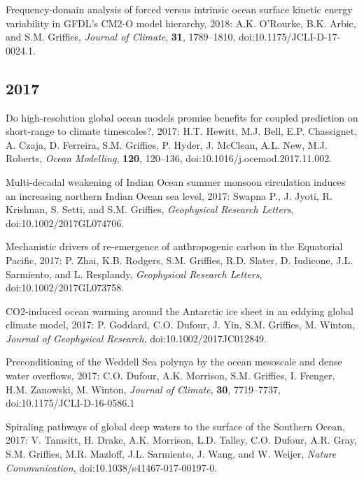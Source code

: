 \begin{etaremune}
\item Frequency-domain analysis of forced versus intrinsic ocean surface kinetic energy variability in GFDL's CM2-O model hierarchy, 2018: A.K. O'Rourke, B.K. Arbic, and S.M. Grif\/f\/ies, {\it Journal of Climate}, {\bf 31}, 1789--1810, doi:10.1175/JCLI-D-17-0024.1.


\subsection*{\sc \color{Maroon} 2017}


\item Do high-resolution global ocean models promise benefits for coupled prediction on short-range to climate timescales?, 2017: H.T. Hewitt, M.J. Bell, E.P. Chassignet, A. Czaja, D. Ferreira, S.M. Grif\/f\/ies, P. Hyder, J. McClean, A.L. New, M.J. Roberts, {\it Ocean Modelling}, {\bf 120}, 120--136, doi:10.1016/j.ocemod.2017.11.002.

\item Multi-decadal weakening of Indian Ocean summer monsoon circulation induces an increasing northern Indian Ocean sea level, 2017: Swapna P., J. Jyoti, R. Krishnan, S. Setti, and S.M. Grif\/f\/ies, {\it Geophysical Research  Letters}, \newline doi:10.1002/2017GL074706.



\item Mechanistic drivers of re-emergence of anthropogenic carbon in the Equatorial Pacific, 2017: P. Zhai, K.B. Rodgers, S.M. Grif\/fies, R.D. Slater, D. Iudicone, J.L. Sarmiento, and L. Resplandy, {\it Geophysical Research Letters}, doi:10.1002/2017GL073758.

\item CO2-induced ocean warming around the Antarctic ice sheet in an eddying global climate model, 2017: P. Goddard, C.O. Dufour, J. Yin, S.M. Grif\/f\/ies, M. Winton, {\it Journal of Geophysical Research}, doi:10.1002/2017JC012849. 

\item Preconditioning of the Weddell Sea polynya by the ocean mesoscale and dense water overflows, 2017: C.O. Dufour, A.K. Morrison, S.M. Grif\/f\/ies, I. Frenger, H.M. Zanowski, M. Winton, {\it Journal of Climate}, {\bf 30}, 7719--7737, doi:10.1175/JCLI-D-16-0586.1

\item Spiraling pathways of global deep waters to the surface of the Southern Ocean, 2017: V. Tamsitt, H.  Drake, A.K. Morrison, L.D. Talley, C.O. Dufour, A.R. Gray, S.M. Grif\/f\/ies, M.R. Mazloff, J.L. Sarmiento, J. Wang, and W. Weijer, {\it Nature Communication}, doi:10.1038/s41467-017-00197-0.


\end{etaremune}
